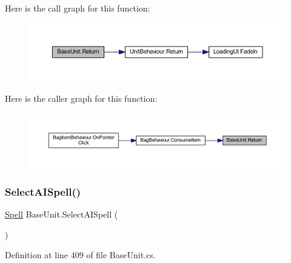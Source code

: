 Here is the call graph for this function\+:
\nopagebreak
\begin{figure}[H]
\begin{center}
\leavevmode
\includegraphics[width=350pt]{class_base_unit_a3091e5ab7a6bd3488f9c0987208a1f4d_cgraph}
\end{center}
\end{figure}
Here is the caller graph for this function\+:
\nopagebreak
\begin{figure}[H]
\begin{center}
\leavevmode
\includegraphics[width=350pt]{class_base_unit_a3091e5ab7a6bd3488f9c0987208a1f4d_icgraph}
\end{center}
\end{figure}
\mbox{\label{class_base_unit_a94ba01b61de9b22ba2431a47caf13cd5}} 
\subsubsection{\texorpdfstring{SelectAISpell()}{SelectAISpell()}}
{\footnotesize\ttfamily \mbox{\hyperlink{class_spell}{Spell}} Base\+Unit.\+Select\+A\+I\+Spell (\begin{DoxyParamCaption}{ }\end{DoxyParamCaption})}



Definition at line 409 of file Base\+Unit.\+cs.


